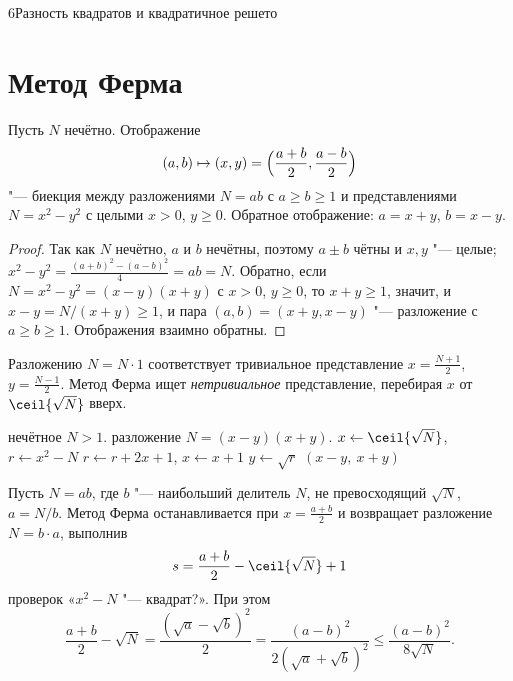 \begin{lecture}{6}{Разность квадратов и квадратичное решето}
\section{Метод Ферма}

\begin{lemma}\label{l6:fermat-bij}
Пусть $N$ нечётно. Отображение
\[
  (a, b) \mapsto (x, y) = \Bigl(\frac{a + b}{2}, \frac{a - b}{2}\Bigr)
\]
"--- биекция между разложениями $N = ab$ с $a \ge b \ge 1$ и представлениями
$N = x^2 - y^2$ с целыми $x > 0$, $y \ge 0$. Обратное отображение: $a = x + y$, $b = x - y$.
\end{lemma}

\begin{proof}
Так как $N$ нечётно, $a$ и $b$ нечётны, поэтому $a \pm b$ чётны и $x, y$ "--- целые;
$x^2 - y^2 = \frac{(a + b)^2 - (a - b)^2}{4} = ab = N$. Обратно, если $N = x^2 - y^2 = (x - y)(x + y)$
с $x > 0$, $y \ge 0$, то $x + y \ge 1$, значит, и $x - y = N/(x + y) \ge 1$, и пара
$(a, b) = (x + y, x - y)$ "--- разложение с $a \ge b \ge 1$. Отображения взаимно обратны.
\end{proof}

Разложению $N = N \cdot 1$ соответствует тривиальное представление
$x = \frac{N + 1}{2}$, $y = \frac{N - 1}{2}$. Метод Ферма ищет \emph{нетривиальное}
представление, перебирая $x$ от $\ceil{\sqrt N}$ вверх.

\begin{algorithm}
\begin{algorithmic}[1]
\Require нечётное $N > 1$.
\Ensure разложение $N = (x - y)(x + y)$.
\State $x \gets \ceil{\sqrt N}$, \quad $r \gets x^2 - N$
  \State $r \gets r + 2x + 1$, \quad $x \gets x + 1$ 
\EndWhile
\State $y \gets \sqrt r$
\State \Return $(x - y,\ x + y)$
\end{algorithmic}
\end{algorithm}

\begin{theorem}\label{l6:fermat-steps}
Пусть $N = ab$, где $b$ "--- наибольший делитель $N$, не превосходящий $\sqrt N$, $a = N/b$.
Метод Ферма останавливается при $x = \frac{a + b}{2}$ и возвращает разложение $N = b \cdot a$,
выполнив
\[
  s = \frac{a + b}{2} - \ceil{\sqrt N} + 1
\]
проверок «$x^2 - N$ "--- квадрат?». При этом
\[
  \frac{a + b}{2} - \sqrt N = \frac{(\sqrt a - \sqrt b)^2}{2} = \frac{(a - b)^2}{2(\sqrt a + \sqrt b)^2}
  \le \frac{(a - b)^2}{8\sqrt N}.
\]
\end{theorem}


\end{lecture}
